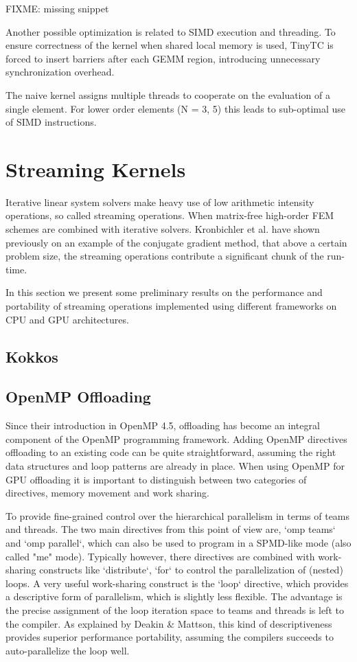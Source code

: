 \documentclass[a4paper,12pt]{article}
\begin{document}
FIXME: missing snippet

Another possible optimization is related to SIMD execution and threading.
To ensure correctness of the kernel when shared local memory is used, TinyTC is forced to insert barriers
after each GEMM region, introducing unnecessary synchronization overhead.

The naive kernel assigns multiple threads to cooperate on the evaluation of a single element.
For lower order elements (N = 3, 5) this leads to sub-optimal use of SIMD instructions. 

\section{Streaming Kernels}

Iterative linear system solvers make heavy use of low arithmetic intensity operations, so called streaming operations.
When matrix-free high-order FEM schemes are combined with iterative solvers. 
Kronbichler et al. \cite{} have shown previously on an example of the conjugate gradient method, that above a certain problem size, the streaming operations contribute a significant chunk of the run-time.

In this section we present some preliminary results on the performance and portability of
streaming operations implemented using different frameworks on CPU and GPU architectures.

\subsection{Kokkos}



\subsection{OpenMP Offloading}

Since their introduction in OpenMP 4.5, offloading has become an integral component
of the OpenMP programming framework.
Adding OpenMP directives offloading to an existing code can be quite straightforward,
assuming the right data structures and loop patterns are already in place.
When using OpenMP for GPU offloading it is important to distinguish between two
categories of directives, memory movement and work sharing.

To provide fine-grained control over the hierarchical parallelism in terms of 
teams and threads. The two main directives from this point of view are, `omp teams` and `omp parallel`, which can also be used to program in a SPMD-like mode (also called "me" mode). Typically however, there directives are combined with work-sharing
constructs like `distribute`, `for` to control the parallelization of (nested) loops.
A very useful work-sharing construct is the `loop` directive, which provides 
a descriptive form of parallelism, which is slightly less flexible.
The advantage is the precise assignment of the loop iteration space to teams and threads is left to the compiler. 
As explained by Deakin \& Mattson, this kind of descriptiveness provides
superior performance portability, assuming the compilers succeeds to auto-parallelize
the loop well.
\end{document}
